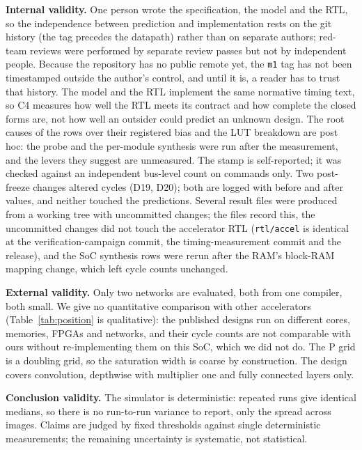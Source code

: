 \documentclass[journal]{IEEEtran}
\begin{document}
\textbf{Internal validity.} One person wrote the specification, the model and the RTL, so the independence between prediction and implementation rests on the git history (the tag precedes the datapath) rather than on separate authors; red-team reviews were performed by separate review passes but not by independent people. Because the repository has no public remote yet, the \texttt{m1} tag has not been timestamped outside the author's control, and until it is, a reader has to trust that history. The model and the RTL implement the same normative timing text, so C4 measures how well the RTL meets its contract and how complete the closed forms are, not how well an outsider could predict an unknown design. The root causes of the rows over their registered bias and the LUT breakdown are post hoc: the probe and the per-module synthesis were run after the measurement, and the levers they suggest are unmeasured. The stamp is self-reported; it was checked against an independent bus-level count on \IndepStampN{} commands only. Two post-freeze changes altered cycles (D19, D20); both are logged with before and after values, and neither touched the predictions. Several result files were produced from a working tree with uncommitted changes; the files record this, the uncommitted changes did not touch the accelerator RTL (\texttt{rtl/accel} is identical at the verification-campaign commit, the timing-measurement commit and the release), and the SoC synthesis rows were rerun after the RAM's block-RAM mapping change, which left cycle counts unchanged.

\textbf{External validity.} Only two networks are evaluated, both from one compiler, both small. We give no quantitative comparison with other accelerators (Table~\ref{tab:position} is qualitative): the published designs run on different cores, memories, FPGAs and networks, and their cycle counts are not comparable with ours without re-implementing them on this SoC, which we did not do. The P grid is a doubling grid, so the saturation width is coarse by construction. The design covers convolution, depthwise with multiplier one and fully connected layers only.

\textbf{Conclusion validity.} The simulator is deterministic: repeated runs give identical medians, so there is no run-to-run variance to report, only the spread across images. Claims are judged by fixed thresholds against single deterministic measurements; the remaining uncertainty is systematic, not statistical.
\end{document}
